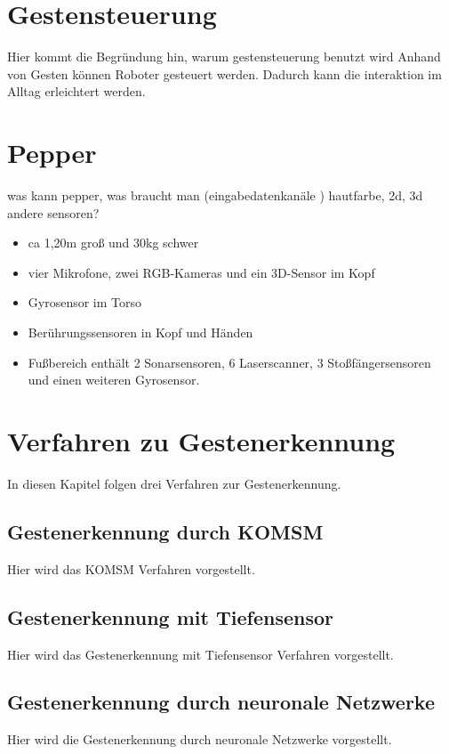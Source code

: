 \documentclass{llncs}
\begin{document}
\section{Gestensteuerung}
Hier kommt die Begründung hin, warum gestensteuerung benutzt wird
Anhand von Gesten k\"onnen Roboter gesteuert werden. Dadurch kann die interaktion im Alltag erleichtert werden. 
\section{Pepper}
 was kann pepper, was braucht man (eingabedatenkan\"ale ) hautfarbe, 2d, 3d andere sensoren?
\begin{itemize}
\item ca 1,20m gro\ss{} und 30kg schwer
\item vier Mikrofone, zwei RGB-Kameras und ein 3D-Sensor im Kopf
\item Gyrosensor im Torso
\item Ber\"uhrungssensoren in Kopf und H\"anden
\item Fu\ss{}bereich enth\"alt 2 Sonarsensoren, 6 Laserscanner, 3 Sto\ss{}f\"angersensoren und einen weiteren Gyrosensor.
\end{itemize}
\section{Verfahren zu Gestenerkennung}
In diesen Kapitel folgen drei Verfahren zur Gestenerkennung.

\subsection{Gestenerkennung durch KOMSM}
Hier wird das KOMSM Verfahren vorgestellt.
\subsection{Gestenerkennung mit Tiefensensor}
Hier wird das Gestenerkennung mit Tiefensensor Verfahren vorgestellt.
\subsection{Gestenerkennung durch neuronale Netzwerke}
Hier wird die Gestenerkennung durch neuronale Netzwerke vorgestellt.
\end{document}
